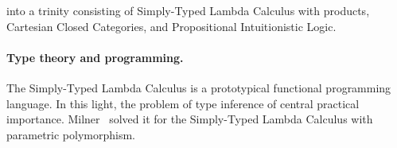 \documentclass[11pt,twocolumn]{article}
\newcommand{\lcalculus}{\mbox{$\lambda$-calculus}}
\begin{document}
into a trinity consisting of Simply-Typed Lambda Calculus with products,
Cartesian Closed Categories, and Propositional Intuitionistic Logic.

\paragraph*{Type theory and programming.}

The Simply-Typed Lambda Calculus 
is a prototypical functional programming language.  
%
In %
this light, %
%
the %
problem of type inference 
of central practical importance.  
Milner~\cite{Milner1978} 
solved it %
for the Simply-Typed Lambda Calculus with parametric polymorphism.  
 
\end{document}
